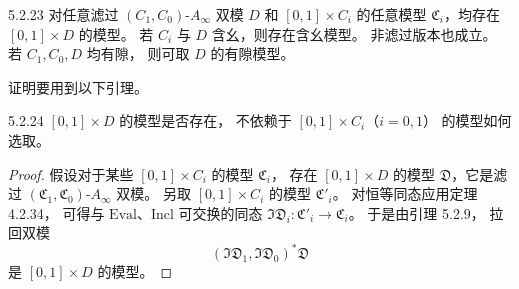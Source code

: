 \begin{theorem}{5.2.23}\label{thm:5-2-23}
对任意滤过 $(C_1,C_0)$-$A_\infty$ 双模 $D$
和 $[0,1]\times C_i$ 的任意模型
$\mathfrak C_i$，均存在
$[0,1]\times D$ 的模型。
若 $C_i$ 与 $D$ 含幺，则存在含幺模型。
非滤过版本也成立。
若 $C_1,C_0,D$ 均有隙，
则可取 $D$ 的有隙模型。
\end{theorem}

证明要用到以下引理。

\begin{lemma}{5.2.24}\label{lem:5-2-24}
$[0,1]\times D$ 的模型是否存在，
不依赖于 $[0,1]\times C_i$（$i=0,1$）
的模型如何选取。
\end{lemma}

\begin{proof}
假设对于某些 $[0,1]\times C_i$ 的模型
$\mathfrak C_i$，
存在 $[0,1]\times D$ 的模型
$\mathfrak D$，它是滤过
$(\mathfrak C_1,\mathfrak C_0)$-$A_\infty$ 双模。
另取 $[0,1]\times C_i$ 的模型
$\mathfrak C'_i$。
对恒等同态应用定理 4.2.34，
可得与 $\mathrm{Eval}$、$\mathrm{Incl}$
可交换的同态
$\mathfrak{ID}_i:\mathfrak C'_i\to\mathfrak C_i$。
于是由引理 5.2.9，
拉回双模
\[
(\mathfrak{ID}_1,\mathfrak{ID}_0)^*
\mathfrak D
\]
是 $[0,1]\times D$ 的模型。
\end{proof}

